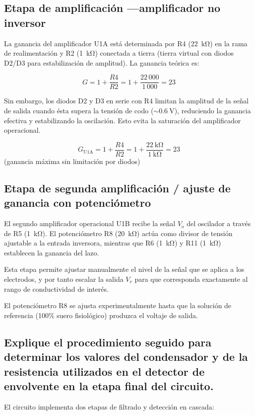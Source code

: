 \documentclass[a4paper,openany,12pt]{book}
\begin{document}
\subsection*{Etapa de amplificación —amplificador no inversor}

La ganancia del amplificador U1A está determinada por R4 (\SI{22}{\kilo\ohm}) en la rama de realimentación y R2 (\SI{1}{\kilo\ohm}) conectada a tierra (tierra virtual con diodos D2/D3 para estabilización de amplitud). La ganancia teórica es:

\[
G = 1 + \frac{R4}{R2} = 1 + \frac{22\,000}{1\,000} = 23
\]

Sin embargo, los diodos D2 y D3  en serie con R4 limitan la amplitud de la señal de salida cuando ésta supera la tensión de codo (\(\sim \SI{0.6}{\volt}\)), reduciendo la ganancia efectiva y estabilizando la oscilación. Esto evita la saturación del amplificador operacional.

\[
G_{\text{U1A}} = 1 + \frac{R4}{R2} = 1 + \frac{\SI{22}{\kilo\ohm}}{\SI{1}{\kilo\ohm}} = 23
\]
(ganancia máxima sin limitación por diodos)

\subsection*{Etapa de segunda amplificación / ajuste de ganancia  con potenciómetro}

El segundo amplificador operacional U1B recibe la señal \(V_o\) del oscilador a través de R5 (\SI{1}{\kilo\ohm}). El potenciómetro R8 (\SI{20}{\kilo\ohm}) actúa como divisor de tensión ajustable a la entrada inversora, mientras que R6 (\SI{1}{\kilo\ohm}) y R11 (\SI{1}{\kilo\ohm}) establecen la ganancia del lazo.

Esta etapa permite ajustar manualmente el nivel de la señal que se aplica a los electrodos, y por tanto escalar la salida \(V_r\) para que corresponda exactamente al rango de conductividad de interés.

El potenciómetro R8 se ajusta experimentalmente hasta que la solución de referencia (100\% suero fisiológico) produzca el voltaje de salida.

\subsection {Explique el procedimiento seguido para determinar los valores del condensador y de la resistencia utilizados en el detector de envolvente en la etapa final del circuito.}
El circuito implementa dos etapas de filtrado y detección en cascada:
\end{document}
